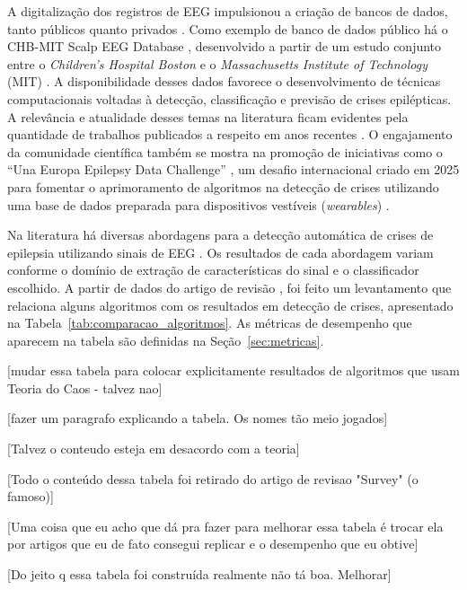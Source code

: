 \documentclass[]{article}
\begin{document}
	A digitalização dos registros de EEG impulsionou a criação de bancos de dados, tanto públicos quanto privados \cite{ihle2012epilepsiae, freiburg_project}. Como exemplo de banco de dados público há o CHB-MIT Scalp EEG Database \cite{physionet_chbmit}, desenvolvido a partir de um estudo conjunto entre o \textit{Children’s Hospital Boston} e o \textit{Massachusetts Institute of Technology} (MIT) \cite{shoeb2009application}. A disponibilidade desses dados favorece o desenvolvimento de técnicas computacionais voltadas à detecção, classificação e previsão de crises epilépticas. A relevância e atualidade desses temas na literatura ficam evidentes pela quantidade de trabalhos publicados a respeito em anos recentes \cite{paveiestudo, ufDelRei_premio, mourad2025lightweight, panchavati2023pretrained, wu2024enhancing}. O engajamento da comunidade científica também se mostra na promoção de iniciativas como o ``Una Europa Epilepsy Data Challenge'' \cite{unaeuropa_epilepsy}, um desafio internacional criado em 2025 para fomentar o aprimoramento de algoritmos na detecção de crises utilizando uma base de dados preparada para dispositivos vestíveis (\textit{wearables}) \cite{bhagubai2025seizeit2}.

	Na literatura há diversas abordagens para a detecção automática de crises de epilepsia utilizando sinais de EEG \cite{acharya2013automated}. Os resultados de cada abordagem variam conforme o domínio de extração de características do sinal e o classificador escolhido. A partir de dados do artigo de revisão \cite{prasanna2021automated}, foi feito um levantamento que relaciona alguns algoritmos com os resultados em detecção de crises, apresentado na Tabela~\ref{tab:comparacao_algoritmos}. As métricas de desempenho que aparecem na tabela são definidas na Seção~\ref{sec:metricas}.

	[mudar essa tabela para colocar explicitamente resultados de algoritmos que usam Teoria do Caos - talvez nao]
	
	[fazer um paragrafo explicando a tabela. Os nomes tão meio jogados]
	
	[Talvez o conteudo esteja em desacordo com a teoria]
	
	[Todo o conteúdo dessa tabela foi retirado do artigo de revisao "Survey" (o famoso)]
	
	[Uma coisa que eu acho que dá pra fazer para melhorar essa tabela é trocar ela por artigos que eu de fato consegui replicar e o desempenho que eu obtive] 
	
	[Do jeito q essa tabela foi construída realmente não tá boa. Melhorar]
	
\end{document}
